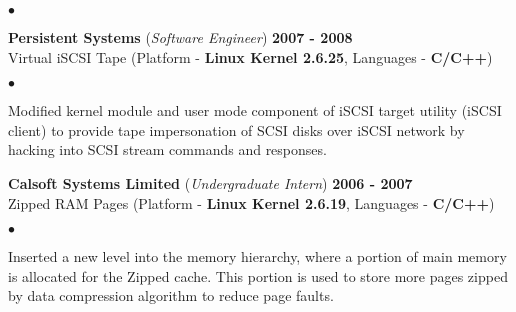 \documentclass[margin,line]{res}
\newenvironment{list2}{
  \begin{list}{$\bullet$}{%
      \setlength{\itemsep}{0.05in}
      \setlength{\parsep}{0in} \setlength{\parskip}{0in}
      \setlength{\topsep}{-0.1in} \setlength{\partopsep}{0in}
      \setlength{\leftmargin}{0.2in}}}{\end{list}}
\begin{document}
\begin{resume}
\begin{list2}
\end{list2}

{\bf Persistent Systems} ({\em Software Engineer}) \hfill {\bf 2007 - 2008}\\
Virtual iSCSI Tape (Platform - {\bf Linux Kernel 2.6.25}, Languages - {\bf C/C++})
\begin{list2}
\item Modified kernel module and user mode component of iSCSI target utility (iSCSI client) to provide
tape impersonation of SCSI disks over iSCSI network by hacking into SCSI stream commands and responses.
\end{list2}

{\bf Calsoft Systems Limited} ({\em Undergraduate Intern}) \hfill {\bf 2006 - 2007}\\
Zipped RAM Pages (Platform - {\bf Linux Kernel 2.6.19}, Languages - {\bf C/C++})
\begin{list2}
\item Inserted a new level into the memory hierarchy, where a portion of main memory is allocated for the Zipped cache. This portion is used to store more pages zipped by data compression algorithm to reduce page faults.
\end{list2}


\end{resume}
\end{document}
